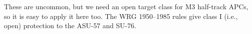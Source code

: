 \begin{withcounters}
{        
        These are uncommon, but we need an open target class for M3 half-track APCs, so it is easy to apply it here too. The WRG 1950--1985 rules give class I (i.e., open) protection to the
        ASU-57 and
        SU-76.

    }\\
    \\
    \\
    \\




\end{withcounters}
